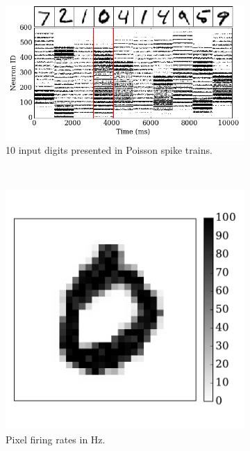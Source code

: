 		\begin{figure}[htbp!]
		\centering
		\begin{subfigure}[t]{0.65\textwidth}
			\includegraphics[width=\textwidth]{pics_iconip/6-1.png}
			\caption{10 input digits presented in Poisson spike trains.}
			\label{Fig:61}
		\end{subfigure}\\
		\begin{subfigure}[t]{0.3\textwidth}
			\includegraphics[width=\textwidth]{pics_iconip/6-2.pdf}
			\caption{Pixel firing rates in Hz.}
			\label{Fig:62}
		\end{subfigure}
		\begin{subfigure}[t]{0.3\textwidth}

\end{subfigure}
\end{figure}
